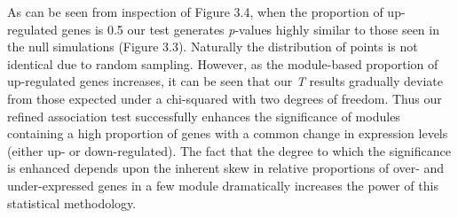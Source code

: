 As can be seen from inspection of Figure 3.4, when the proportion of up-regulated genes is 0.5 our test generates \textit{p}-values highly similar to those seen in the null simulations (Figure 3.3). Naturally the distribution of points is not identical due to random sampling. However, as the module-based proportion of up-regulated genes increases, it can be seen that our \textit{T} results gradually deviate from those expected under a chi-squared with two degrees of freedom. Thus our refined association test successfully enhances the significance of modules containing a high proportion of genes with a common change in expression levels (either up- or down-regulated). The fact that the degree to which the significance is enhanced depends upon the inherent skew in relative proportions of over- and under-expressed genes in a few module dramatically increases the power of this statistical methodology. 

